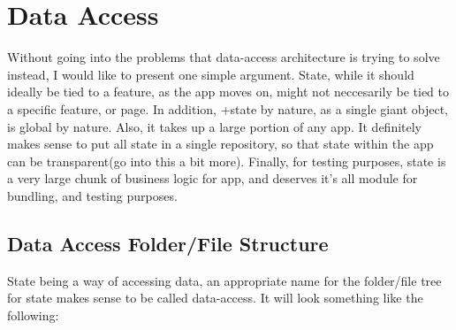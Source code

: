 \maketitle{}
\section{ Data Access }

Without going into the problems that data-access architecture is trying to solve
instead, I would like to present one simple argument. State, while it should
ideally be tied to a feature, as the app moves on, might not neccesarily be
tied to a specific feature, or page. In addition, +state by nature, as a single
giant object, is global by nature. Also, it takes up a large portion of any app.
It definitely makes sense to put all state in a single repository, so that state
within the app can be transparent(go into this a bit more). Finally, for testing
purposes, state is a very large chunk of business logic for app, and deserves
it's all module for bundling, and testing purposes.

\subsection{Data Access Folder/File Structure }
State being a way of accessing data, an appropriate name for the folder/file
tree for state makes sense to be called data-access. It will look something
like the following:



